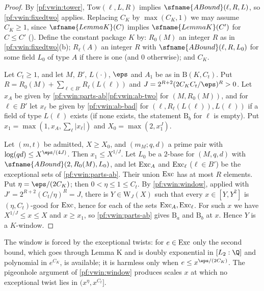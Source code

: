 \begin{proof}
By \cref{pf:vwin:tower}, $\mathrm{Tow}(\ell,L,R)$ implies $\sfname{ABound}(\ell,R,L)$, so \cref{pf:vwin:fixedtwo} applies. Replacing $C_K$ by
$\max(C_K,1)$ we may assume $C_K\ge1$, since $\sfname{LemmaK}(C)$ implies $\sfname{LemmaK}(C')$ for $C\le C'$
(). Define the constant package $K$ by: $R_0(M)$ an integer $R$ as in
\cref{pf:vwin:fixedtwo}(b); $R_\ell(A)$ an integer $R$ with $\sfname{ABound}(\ell,R,L_0)$ for some field $L_0$ of type $A$ if there is one
(and $0$ otherwise); and $C_K$.

Let $C_t\ge1$, and let $M$, $B'$, $L(\cdot)$, $\eps$ and $A_1$ be as in $\mathrm{B}(K,C_t)$. Put $R=R_0(M)+\sum_{\ell\in B'}R_\ell(L(\ell))$ and
$J=2^{R+2}(2C_KC_t/\eps)^R>0$. Let $x_A$ be given by \cref{pf:vwin:parts-ab}\ref{pf:vwin:ab-two} for $(M,R_0(M))$, and for $\ell\in B'$ let $x_\ell$ be
given by \ref{pf:vwin:ab-bad} for $(\ell,R_\ell(L(\ell)),L(\ell))$ if a field of type $L(\ell)$ exists (if none exists, the statement $\mathrm{B}_b$
for $\ell$ is empty). Put $x_1=\max(1,x_A,\sum_\ell|x_\ell|)$ and $X_0=\max(2,x_1^J)$.

Let $(m,t)$ be admitted, $X\ge X_0$, and $(m_M;q,d)$ a prime pair with $\log(qd)\le X^{\eps/(4J)}$. Then $x_1\le X^{1/J}$. Let $L_0$ be a $2$-base
for $(M,q,d)$ with $\sfname{ABound}(2,R_0(M),L_0)$, and let $\mathrm{Exc}_A$ and $\mathrm{Exc}_\ell$ ($\ell\in B'$) be the exceptional sets of
\cref{pf:vwin:parts-ab}. Their union $\mathrm{Exc}$ has at most $R$ elements. Put $\eta=\eps/(2C_K)$; then $0<\eta\le1\le C_t$. By
\cref{pf:vwin:window}, applied with $J'=2^{R+2}(C_t/\eta)^R=J$, there is $Y\in\mathrm{W}_J(X)$ such that every $x\in[Y,Y^2]$ is
$(\eta,C_t)$-good for $\mathrm{Exc}$, hence for each of the sets $\mathrm{Exc}_A,\mathrm{Exc}_\ell$. For such $x$ we have $X^{1/J}\le x\le X$ and
$x\ge x_1$, so \cref{pf:vwin:parts-ab} gives $\mathrm{B}_a$ and $\mathrm{B}_b$ at $x$. Hence $Y$ is a $K$-window.
\end{proof}

\begin{remark}\label{pf:vwin:rem-window}
The window is forced by the exceptional twists: for $e\in\mathrm{Exc}$ only the second bound, which goes through Lemma K and is
doubly exponential in $[L_2:\Q]$ and polynomial in $e^{C_K}$, is available; it is harmless only when $e\le x^{\eps/(2C_K)}$. The
pigeonhole argument of \cref{pf:vwin:window} produces scales $x$ at which no exceptional twist lies in $(x^{\eta},x^{C_t}]$.
\end{remark}


